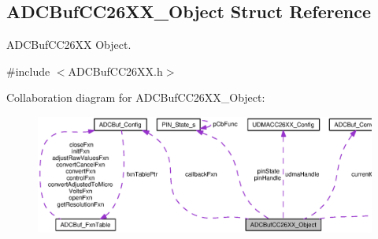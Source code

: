 \subsection{A\+D\+C\+Buf\+C\+C26\+X\+X\+\_\+\+Object Struct Reference}
\label{struct_a_d_c_buf_c_c26_x_x___object}


A\+D\+C\+Buf\+C\+C26\+X\+X Object.  




{\ttfamily \#include $<$A\+D\+C\+Buf\+C\+C26\+X\+X.\+h$>$}



Collaboration diagram for A\+D\+C\+Buf\+C\+C26\+X\+X\+\_\+\+Object\+:
\nopagebreak
\begin{figure}[H]
\begin{center}
\leavevmode
\includegraphics[width=350pt]{struct_a_d_c_buf_c_c26_x_x___object__coll__graph}
\end{center}
\end{figure}
